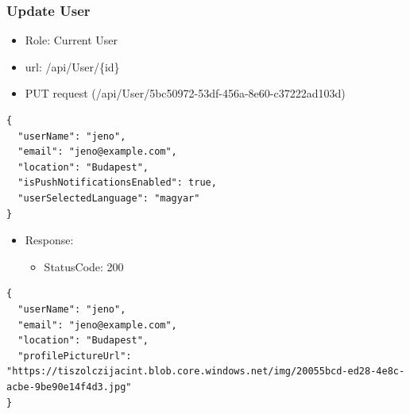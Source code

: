 \documentclass[11pt]{article}
\begin{document}
\subsubsection{Update User}
\label{sec:org33430ac}
\begin{itemize}
\item Role: Current User
\item url: /api/User/\{id\}
\item PUT request (/api/User/5bc50972-53df-456a-8e60-c37222ad103d)
\end{itemize}
\begin{verbatim}
{
  "userName": "jeno",
  "email": "jeno@example.com",
  "location": "Budapest",
  "isPushNotificationsEnabled": true,
  "userSelectedLanguage": "magyar"
}
\end{verbatim}
\begin{itemize}
\item Response:
\begin{itemize}
\item StatusCode: 200
\end{itemize}
\end{itemize}
\begin{verbatim}
{
  "userName": "jeno",
  "email": "jeno@example.com",
  "location": "Budapest",
  "profilePictureUrl": "https://tiszolczijacint.blob.core.windows.net/img/20055bcd-ed28-4e8c-acbe-9be90e14f4d3.jpg"
}
\end{verbatim}
\end{document}
